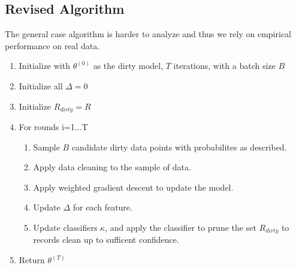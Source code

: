 \subsection{Revised Algorithm}
The general case algorithm is harder to analyze and thus we rely on empirical performance on real data.
\begin{enumerate}[noitemsep]
\item Initialize with $\theta^{(0)}$ as the dirty model, $T$ iterations, with a batch size $B$
\item Initialize all $\Delta = 0$
\item Initialize $R_{dirty} = R$
\item For rounds i=1...T
\begin{enumerate}
	\item Sample $B$ candidate dirty data points with probabilites as described.
	\item Apply data cleaning to the sample of data.
	\item Apply weighted gradient descent to update the model.
	\item Update $\Delta$ for each feature.
	\item Update classifiers $\kappa$, and apply the classifier to prune the set $R_{dirty}$ to records clean up to sufficent confidence.
\end{enumerate}
\item Return $\theta^{(T)}$
\end{enumerate}
